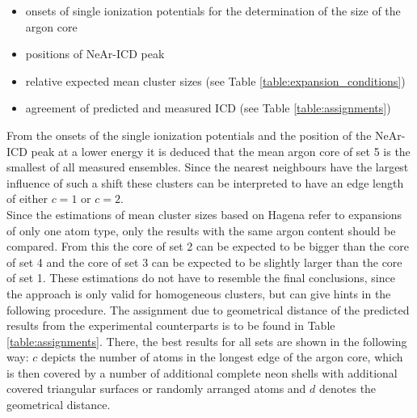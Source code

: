 \begin{itemize}
 \item onsets of single ionization potentials for the determination
       of the size of the argon core
 \item positions of NeAr-ICD peak
 \item relative expected mean cluster sizes
       (see Table \ref{table:expansion_conditions})
 \item agreement of predicted and measured ICD (see Table \ref{table:assignments})
\end{itemize}

From the onsets of the single ionization potentials and the position of the
NeAr-ICD peak at a lower energy it is deduced that the mean argon core of set 5
is the smallest of all measured ensembles. Since the nearest neighbours have
the largest influence of such a shift these clusters can be interpreted to have
an edge length of either $c=1$ or $c=2$.\\
Since the estimations of mean cluster sizes based on Hagena refer to expansions
of only one atom type, only the results with the same argon content should
be compared. From this the core of set 2 can be expected to be bigger than the core
of set 4 and the core of set 3 can be expected to be slightly larger
than the core of set 1.
These estimations do not have to resemble the final conclusions, since the
approach is only valid for homogeneous clusters, but can give hints
in the following procedure. The assignment due to geometrical distance
of the predicted results from the experimental counterparts is to be found in
Table \ref{table:assignments}. There, the best results for all sets are shown
in the following way: $c$ depicts the number of atoms in the longest edge
of the argon core, which is then covered by a number of additional complete
neon shells with additional covered triangular surfaces or randomly arranged atoms
and $d$ denotes the geometrical distance.

